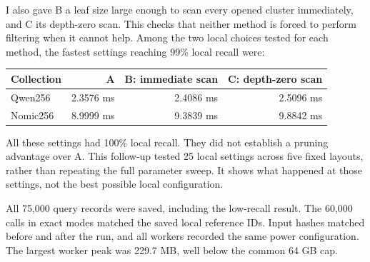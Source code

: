 I also gave B a leaf size large enough to scan every opened cluster immediately, and C its depth-zero scan. This checks that neither method is forced to perform filtering when it cannot help. Among the two local choices tested for each method, the fastest settings reaching 99\% local recall were:
\begin{center}\small
\begin{tabular}{@{}lrrr@{}}\toprule
Collection & A & B: immediate scan & C: depth-zero scan\\\midrule
Qwen256 & 2.3576 ms & 2.4086 ms & 2.5096 ms\\
Nomic256 & 8.9999 ms & 9.3839 ms & 9.8842 ms\\\bottomrule
\end{tabular}
\end{center}
All these settings had 100\% local recall. They did not establish a pruning advantage over A. This follow-up tested 25 local settings across five fixed layouts, rather than repeating the full parameter sweep. It shows what happened at those settings, not the best possible local configuration.

All 75,000 query records were saved, including the low-recall result. The 60,000 calls in exact modes matched the saved local reference IDs. Input hashes matched before and after the run, and all workers recorded the same power configuration. The largest worker peak was 229.7 MB, well below the common 64 GB cap.
